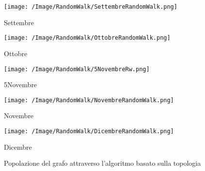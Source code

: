 \begin{figure}[!htbp]
\centering
\begin{minipage}[c]{.40\textwidth}
\centering\setlength{\captionmargin}{0pt}%
\texttt{[image: /Image/RandomWalk/SettembreRandomWalk.png]}
\caption{Settembre}
\label{Passo0}
\end{minipage}%
\hspace{10mm}%
\begin{minipage}[c]{.40\textwidth}
\centering\setlength{\captionmargin}{0pt}%
\texttt{[image: /Image/RandomWalk/OttobreRandomWalk.png]}
\caption{Ottobre}
\label{Passo1}
\end{minipage}
\hspace{10mm}%
\begin{minipage}[c]{.40\textwidth}
\centering\setlength{\captionmargin}{0pt}%
\texttt{[image: /Image/RandomWalk/5NovembreRw.png]}
\caption{5Novembre}
\label{Passo2}
\end{minipage}
\hspace{10mm}%
\begin{minipage}[c]{.40\textwidth}
\centering\setlength{\captionmargin}{0pt}%
\texttt{[image: /Image/RandomWalk/NovembreRandomWalk.png]}
\caption{Novembre}
\label{Passo3}
\end{minipage}
\hspace{10mm}%
\begin{minipage}[c]{.40\textwidth}
\centering\setlength{\captionmargin}{0pt}%
\texttt{[image: /Image/RandomWalk/DicembreRandomWalk.png]}
\caption{Dicembre}
\label{Passo3}
\end{minipage}
\caption{Popolazione del grafo attraverso l'algoritmo basato sulla topologia}\label{grafoTopologia}
\end{figure}


